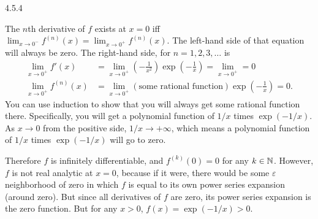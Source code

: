 \documentclass{article}
\begin{document}
\bigskip
\begin{prob}
    4.5.4
\end{prob}
The $n$th derivative of $f$ exists at $x=0$ iff $\lim_{x \rightarrow 0^-} f^{(n)}(x) = \lim_{x \rightarrow 0^+} f^{(n)}(x)$. The left-hand side of that equation will always be zero. The right-hand side, for $n=1,2,3,\dots$ is
\begin{align*}
    \lim_{x \rightarrow 0^+} f'(x) &= \lim_{x \rightarrow 0^+} \left( - \frac{1}{x^2} \right) \exp \left( - \frac{1}{x} \right) = \lim_{x \rightarrow 0^+} = 0 \\
    \lim_{x \rightarrow 0^+} f^{(n)}(x) &= \lim_{x \rightarrow 0^+} \left( \text{some rational function} \right) \exp \left( - \frac{1}{x} \right) = 0.
\end{align*}
You can use induction to show that you will always get some rational function there. Specifically, you will get a polynomial function of $1/x$ times $\exp(-1/x)$. As $x \rightarrow 0$ from the positive side, $1/x \rightarrow +\infty$, which means a polynomial function of $1/x$ times $\exp(-1/x)$ will go to zero.
\par
Therefore $f$ is infinitely differentiable, and $f^{(k)}(0)=0$ for any $k \in \mathbb{N}$. However, $f$ is not real analytic at $x=0$, because if it were, there would be some $\varepsilon$ neighborhood of zero in which $f$ is equal to its own power series expansion (around zero). But since all derivatives of $f$ are zero, its power series expansion is the zero function. But for any $x>0$, $f(x)=\exp(-1/x)>0$.
\end{document}
